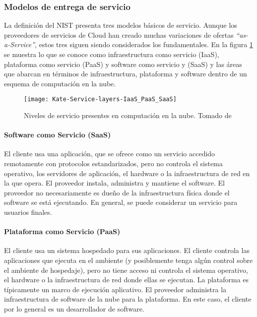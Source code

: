 \subsubsection{Modelos de entrega de servicio}

La definición del NIST presenta tres modelos básicos de servicio. Aunque los proveedores de servicios de Cloud han creado muchas variaciones de ofertas \emph{``as-a-Service''}, estos tres siguen siendo considerados los fundamentales. En la figura \ref{fig:iaas-vs-paas-vs-saas} se muestra lo que se conoce como infraestructura como servicio (IaaS), plataforma como servicio (PaaS) y software como servicio y (SaaS) y las áreas que abarcan en términos de infraestructura, plataforma y software dentro de un esquema de computación en la nube.

\begin{figure}[h]
  \centering
  \texttt{[image: Kate-Service-layers-IaaS\_PaaS\_SaaS]}
  \caption[Niveles de servicio presentes en computación en la nube]{Niveles de servicio presentes en computación en la nube. Tomado de \protect\cite{kate-craig}}
  \label{fig:iaas-vs-paas-vs-saas}
\end{figure}


\paragraph{Software como Servicio (SaaS)}
El cliente usa una aplicación, que se ofrece como un servicio accedido remotamente con protocolos estandarizados, pero no controla el sistema operativo, los servidores de aplicación, el hardware o la infraestructura de red en la que opera. El proveedor instala, administra y mantiene el software. El proveedor no necesariamente es dueño de la infraestructura física donde el software se está ejecutando. En general, se puede considerar un servicio para usuarios finales.

\paragraph{Plataforma como Servicio (PaaS)}
El cliente usa un sistema hospedado para sus aplicaciones. El cliente controla las aplicaciones que ejecuta en el ambiente (y posiblemente tenga algún control sobre el ambiente de hospedaje), pero no tiene acceso ni controla el sistema operativo, el hardware o la infraestructura de red donde ellas se ejecutan. La plataforma es típicamente un marco de ejecución aplicativo. El proveedor administra la infraestructura de software de la nube para la plataforma. En este caso, el cliente por lo general es un desarrollador de software.

